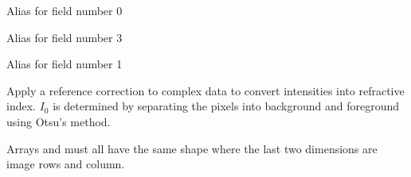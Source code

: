 \documentclass[letterpaper,10pt,english]{sphinxmanual}
\begin{document}
\begin{fulllineitems}
\begin{fulllineitems}
\label{\detokenize{xanespy:xanespy.xanes_math.KEdgeParams.scale}}
Alias for field number 0

\end{fulllineitems}


\begin{fulllineitems}
\label{\detokenize{xanespy:xanespy.xanes_math.KEdgeParams.sigw}}
Alias for field number 3

\end{fulllineitems}


\begin{fulllineitems}
\label{\detokenize{xanespy:xanespy.xanes_math.KEdgeParams.voffset}}
Alias for field number 1

\end{fulllineitems}


\end{fulllineitems}


\begin{fulllineitems}
\label{\detokenize{xanespy:xanespy.xanes_math.apply_internal_reference}}
Apply a reference correction to complex data to convert intensities
into refractive index. \(I_0\) is determined by separating the pixels
into background and foreground using Otsu’s method.

Arrays  and  must all have the same shape where
the last two dimensions are image rows and column.

\end{fulllineitems}

\end{document}
